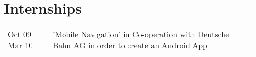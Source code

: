 \section*{Internships}
\begin{tabular}{p{3cm}p{10cm}}	
Oct 09 – Mar 10		& 	'Mobile Navigation' in Co-operation with Deutsche Bahn AG in order to create an Android App\\
\end{tabular}


